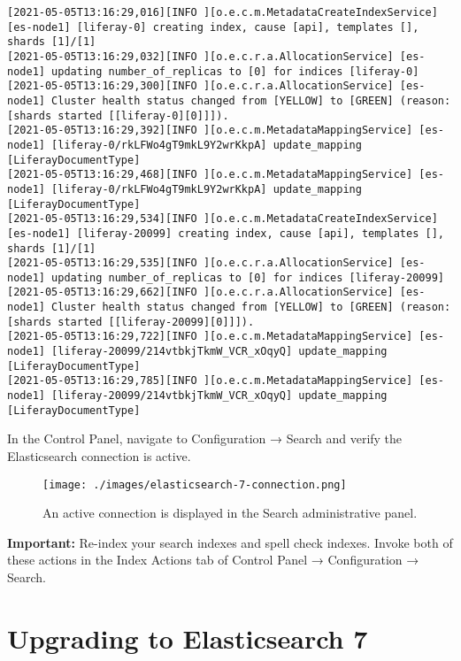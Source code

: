 \begin{verbatim}
[2021-05-05T13:16:29,016][INFO ][o.e.c.m.MetadataCreateIndexService] [es-node1] [liferay-0] creating index, cause [api], templates [], shards [1]/[1]
[2021-05-05T13:16:29,032][INFO ][o.e.c.r.a.AllocationService] [es-node1] updating number_of_replicas to [0] for indices [liferay-0]
[2021-05-05T13:16:29,300][INFO ][o.e.c.r.a.AllocationService] [es-node1] Cluster health status changed from [YELLOW] to [GREEN] (reason: [shards started [[liferay-0][0]]]).
[2021-05-05T13:16:29,392][INFO ][o.e.c.m.MetadataMappingService] [es-node1] [liferay-0/rkLFWo4gT9mkL9Y2wrKkpA] update_mapping [LiferayDocumentType]
[2021-05-05T13:16:29,468][INFO ][o.e.c.m.MetadataMappingService] [es-node1] [liferay-0/rkLFWo4gT9mkL9Y2wrKkpA] update_mapping [LiferayDocumentType]
[2021-05-05T13:16:29,534][INFO ][o.e.c.m.MetadataCreateIndexService] [es-node1] [liferay-20099] creating index, cause [api], templates [], shards [1]/[1]
[2021-05-05T13:16:29,535][INFO ][o.e.c.r.a.AllocationService] [es-node1] updating number_of_replicas to [0] for indices [liferay-20099]
[2021-05-05T13:16:29,662][INFO ][o.e.c.r.a.AllocationService] [es-node1] Cluster health status changed from [YELLOW] to [GREEN] (reason: [shards started [[liferay-20099][0]]]).
[2021-05-05T13:16:29,722][INFO ][o.e.c.m.MetadataMappingService] [es-node1] [liferay-20099/214vtbkjTkmW_VCR_xOqyQ] update_mapping [LiferayDocumentType]
[2021-05-05T13:16:29,785][INFO ][o.e.c.m.MetadataMappingService] [es-node1] [liferay-20099/214vtbkjTkmW_VCR_xOqyQ] update_mapping [LiferayDocumentType]
\end{verbatim}

In the Control Panel, navigate to Configuration → Search and verify the
Elasticsearch connection is active.

\begin{figure}
\centering
\texttt{[image: ./images/elasticsearch-7-connection.png]}
\caption{An active connection is displayed in the Search administrative
panel.}
\end{figure}

\noindent\hrulefill

\textbf{Important:} Re-index your search indexes and spell check
indexes. Invoke both of these actions in the Index Actions tab of
Control Panel → Configuration → Search.

\section{Upgrading to Elasticsearch
7}\label{upgrading-to-elasticsearch-7}

